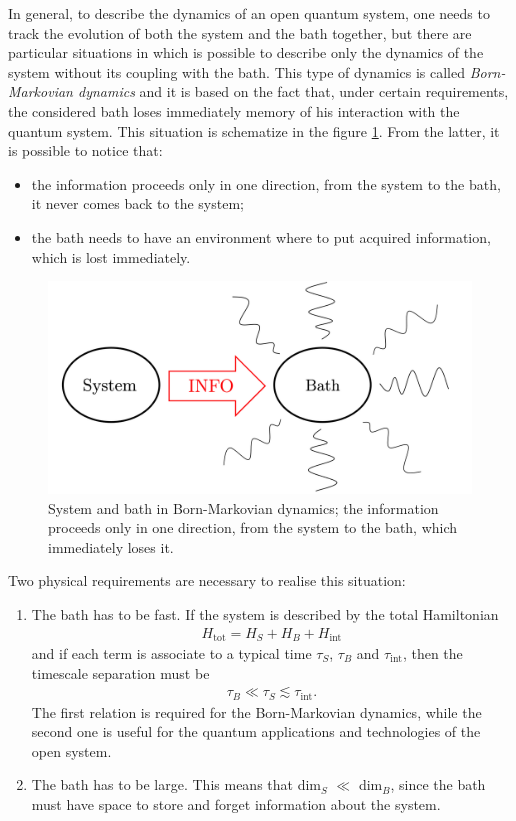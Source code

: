 In general, to describe the dynamics of an open quantum system, one needs to track the evolution of both the system and the bath together, but there are particular situations in which is possible to describe only the dynamics of the system without its coupling with the bath. This type of dynamics is called \textit{Born-Markovian dynamics} and it is based on the fact that, under certain requirements, the considered bath loses immediately memory of his interaction with the quantum system. This situation is schematize in the figure \ref{fig:sys_bath}. From the latter, it is possible to notice that:
\begin{itemize}
    \item the information proceeds only in one direction, from the system to the bath, it never comes back to the system;
    \item the bath needs to have an environment where to put acquired information, which is lost immediately.
\end{itemize}

\begin{figure}[H]
\centering
\includegraphics[width=0.68\linewidth]{images/System_and_Bath.png}
    \caption{System and bath in Born-Markovian dynamics; the information proceeds only in one direction, from the system to the bath, which immediately loses it.}
    \label{fig:sys_bath}
\end{figure}
Two physical requirements are necessary to realise this situation: 
\begin{enumerate}
    \item The bath has to be fast. If the system is described by the total Hamiltonian 
    \begin{align}
        H_\text{tot} = H_S + H_B + H_\text{int}
        \label{eq:HamLind}
    \end{align}
    and if each term is associate to a typical time $\tau_S$, $\tau_B$ and $\tau_\text{int}$, then the timescale separation must be
    \begin{align*}
        \tau_B \ll \tau_S  \lesssim \tau_\text{int}. 
    \end{align*}
    The first relation is required for the Born-Markovian dynamics, while the second one is useful for the quantum applications and technologies of the open system. 
    \item The bath has to be large. This means that dim$_S$ $\ll$ dim$_B$, since the bath must have space to store and forget information about the system. 
\end{enumerate}

